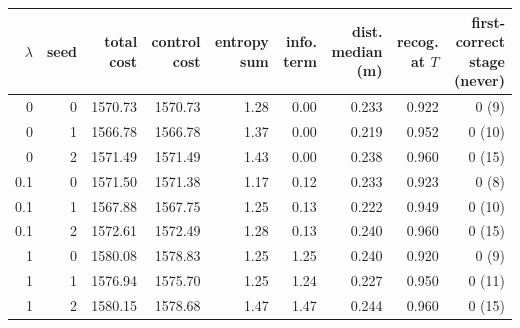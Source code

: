 \begin{tabular}{rrrrrrrrr}
\toprule
$\lambda$ & seed & total cost & control cost & entropy sum & info. term & dist. median (m) & recog. at $T$ & first-correct stage (never) \\
\midrule
0 & 0 & 1570.73 & 1570.73 & 1.28 & 0.00 & 0.233 & 0.922 & 0 (9) \\
0 & 1 & 1566.78 & 1566.78 & 1.37 & 0.00 & 0.219 & 0.952 & 0 (10) \\
0 & 2 & 1571.49 & 1571.49 & 1.43 & 0.00 & 0.238 & 0.960 & 0 (15) \\
0.1 & 0 & 1571.50 & 1571.38 & 1.17 & 0.12 & 0.233 & 0.923 & 0 (8) \\
0.1 & 1 & 1567.88 & 1567.75 & 1.25 & 0.13 & 0.222 & 0.949 & 0 (10) \\
0.1 & 2 & 1572.61 & 1572.49 & 1.28 & 0.13 & 0.240 & 0.960 & 0 (15) \\
1 & 0 & 1580.08 & 1578.83 & 1.25 & 1.25 & 0.240 & 0.920 & 0 (9) \\
1 & 1 & 1576.94 & 1575.70 & 1.25 & 1.24 & 0.227 & 0.950 & 0 (11) \\
1 & 2 & 1580.15 & 1578.68 & 1.47 & 1.47 & 0.244 & 0.960 & 0 (15) \\
\bottomrule
\end{tabular}